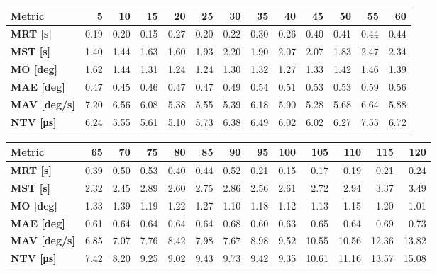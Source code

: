 \begin{tabular*}{\textwidth}{@{\extracolsep{\fill}}l|rrrrrrrrrrrr}
    \toprule
    \textbf{Metric} & \textbf{5} & \textbf{10} & \textbf{15} & \textbf{20} & \textbf{25} & \textbf{30} & \textbf{35} & \textbf{40} & \textbf{45} & \textbf{50} & \textbf{55} & \textbf{60} \\
    \midrule
    \textbf{MRT [s]} & 0.19 & 0.20 & 0.15 & 0.27 & 0.20 & 0.22 & 0.30 & 0.26 & 0.40 & 0.41 & 0.44 & 0.44 \\
    \textbf{MST [s]} & 1.40 & 1.44 & 1.63 & 1.60 & 1.93 & 2.20 & 1.90 & 2.07 & 2.07 & 1.83 & 2.47 & 2.34 \\
    \textbf{MO  [deg]} & 1.62 & 1.44 & 1.31 & 1.24 & 1.24 & 1.30 & 1.32 & 1.27 & 1.33 & 1.42 & 1.46 & 1.39 \\
    \textbf{MAE [deg]} & 0.47 & 0.45 & 0.46 & 0.47 & 0.47 & 0.49 & 0.54 & 0.51 & 0.53 & 0.53 & 0.59 & 0.56 \\
    \textbf{MAV [deg/s]} & 7.20 & 6.56 & 6.08 & 5.38 & 5.55 & 5.39 & 6.18 & 5.90 & 5.28 & 5.68 & 6.64 & 5.88 \\
    \textbf{NTV [\si{\micro\second}]} & 6.24 & 5.55 & 5.61 & 5.10 & 5.73 & 6.38 & 6.49 & 6.02 & 6.02 & 6.27 & 7.55 & 6.72 \\
    \bottomrule
\end{tabular*}

\begin{tabular*}{\textwidth}{@{\extracolsep{\fill}}l|rrrrrrrrrrrr}
    \toprule
    \textbf{Metric} & \textbf{65} & \textbf{70} & \textbf{75} & \textbf{80} & \textbf{85} & \textbf{90} & \textbf{95} & \textbf{100} & \textbf{105} & \textbf{110} & \textbf{115} & \textbf{120} \\
    \midrule
    \textbf{MRT [s]} & 0.39 & 0.50 & 0.53 & 0.40 & 0.44 & 0.52 & 0.21 & 0.15 & 0.17 & 0.19 & 0.21 & 0.24 \\
    \textbf{MST [s]} & 2.32 & 2.45 & 2.89 & 2.60 & 2.75 & 2.86 & 2.56 & 2.61 & 2.72 & 2.94 & 3.37 & 3.49 \\
    \textbf{MO  [deg]} & 1.33 & 1.39 & 1.19 & 1.22 & 1.27 & 1.10 & 1.18 & 1.12 & 1.13 & 1.15 & 1.20 & 1.01 \\
    \textbf{MAE [deg]} & 0.61 & 0.64 & 0.64 & 0.64 & 0.64 & 0.68 & 0.60 & 0.63 & 0.65 & 0.64 & 0.69 & 0.73 \\
    \textbf{MAV [deg/s]} & 6.85 & 7.07 & 7.76 & 8.42 & 7.98 & 7.67 & 8.98 & 9.52 & 10.55 & 10.56 & 12.36 & 13.82 \\
    \textbf{NTV [\si{\micro\second}]} & 7.42 & 8.20 & 9.25 & 9.02 & 9.43 & 9.73 & 9.42 & 9.35 & 10.61 & 11.16 & 13.57 & 15.08 \\
    \bottomrule
\end{tabular*}

